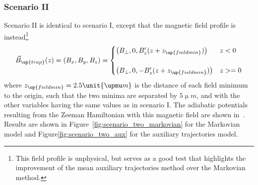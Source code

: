 \subsubsection{Scenario II}
Scenario II is identical to scenario I, except that the magnetic field profile is instead\footnote{This field profile is unphysical, but serves as a good test that highlights the improvement of the mean auxiliary trajectories method over the Markovian method.}
\begin{align}
\vec B_\up{trap}(z) = (B_x, B_y, B_z) = \begin{cases}
\left(B_\perp, 0, B_z^\prime (z + z_\up{fieldmin})\right) & z < 0\\
\\
\left(B_\perp, 0, -B_z^\prime  (z + z_\up{fieldmin})\right) & z >= 0
\end{cases}
\end{align}
where $z_\up{fieldmin} = 2.5\unit{\upmu m}$ is the distance of each field minimum to the origin, such that the two minima are separated by $5\unit{\upmu m}$, and with the other variables having the same values as in scenario I. The adiabatic potentials resulting from the Zeeman Hamiltonian with this magnetic field are shown in~. Results are shown in Figure~\ref{fig:scenario_two_markovian} for the Markovian model and Figure\ref{fig:scenario_two_aux} for the auxiliary trajectories model.

